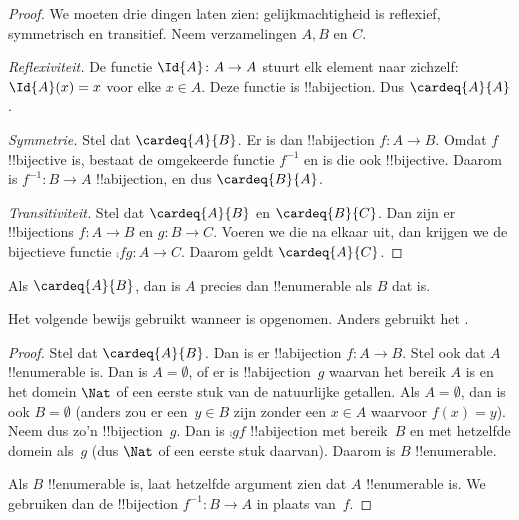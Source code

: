\documentclass[openany]{memoir}
\begin{document}
\begin{proof} 
We moeten drie dingen laten zien: gelijkmachtigheid is reflexief, symmetrisch
en transitief. Neem verzamelingen $A, B$ en $C$.

\emph{Reflexiviteit.} De functie $\Id{A} \colon A \to A$ stuurt elk element
naar zichzelf: $\Id{A} (x) = x$ voor elke $x \in A$. Deze functie is
!!a{bijection}. Dus
$\cardeq{A}{A}$.

\emph{Symmetrie.} Stel dat $\cardeq{A}{B}$. Er is dan !!a{bijection}
$f\colon A \to B$. Omdat $f$ !!{bijective} is, bestaat de omgekeerde functie
$f^{-1}$ en is die ook !!{bijective}. Daarom is
$f^{-1}\colon B \to A$ !!a{bijection}, en dus $\cardeq{B}{A}$.

\emph{Transitiviteit.} Stel dat $\cardeq{A}{B}$ en $\cardeq{B}{C}$. Dan zijn
er !!{bijection}s $f\colon A \to B$ en $g\colon B \to C$. Voeren we die na
elkaar uit, dan krijgen we de bijectieve functie $\comp{f}{g}\colon A \to C$.
Daarom geldt $\cardeq{A}{C}$.
\end{proof}

\begin{prop}
Als $\cardeq{A}{B}$, dan is $A$ precies dan !!{enumerable} als $B$ dat is.
\end{prop}

\begin{editorial}
Het volgende bewijs gebruikt  wanneer
 is opgenomen. Anders gebruikt het
.
\end{editorial}

\begin{proof}
Stel dat $\cardeq{A}{B}$. Dan is er !!a{bijection} $f \colon A
\to B$. Stel ook dat $A$ !!{enumerable} is.
{
  Dan is $A = \emptyset$, of er is !!a{bijection}~$g$ waarvan het bereik
  $A$ is en het domein $\Nat$ of een eerste stuk van de natuurlijke getallen. Als
  $A = \emptyset$, dan is ook $B = \emptyset$ (anders zou er een~$y \in B$
  zijn zonder een $x \in A$ waarvoor $f(x) = y$). Neem dus zo'n
  !!{bijection}~$g$. Dan is $\comp{g}{f}$ !!a{bijection} met bereik~$B$ en
  met hetzelfde domein als~$g$ (dus $\Nat$ of een eerste stuk daarvan).
  Daarom is $B$ !!{enumerable}.}

Als $B$ !!{enumerable} is, laat hetzelfde argument zien dat $A$
!!{enumerable} is. We gebruiken dan de !!{bijection} $f^{-1}\colon B \to A$
in plaats van~$f$.
\end{proof}
\end{document}
